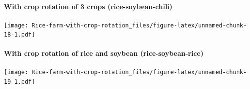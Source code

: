 \documentclass[
]{article}
\newenvironment{Shaded}{\begin{snugshade}}{\end{snugshade}}
\newcommand{\AttributeTok}[1]{\textcolor[rgb]{0.13,0.29,0.53}{#1}}
\newcommand{\DecValTok}[1]{\textcolor[rgb]{0.00,0.00,0.81}{#1}}
\newcommand{\FunctionTok}[1]{\textcolor[rgb]{0.13,0.29,0.53}{\textbf{#1}}}
\newcommand{\NormalTok}[1]{#1}
\newcommand{\OtherTok}[1]{\textcolor[rgb]{0.56,0.35,0.01}{#1}}
\newcommand{\SpecialCharTok}[1]{\textcolor[rgb]{0.81,0.36,0.00}{\textbf{#1}}}
\begin{document}
\hypertarget{with-crop-rotation-of-3-crops-rice-soybean-chili-1}{%
\paragraph{With crop rotation of 3 crops
(rice-soybean-chili)}\label{with-crop-rotation-of-3-crops-rice-soybean-chili-1}}

\begin{Shaded}
\end{Shaded}

\texttt{[image: Rice-farm-with-crop-rotation\_files/figure-latex/unnamed-chunk-18-1.pdf]}

\hypertarget{with-crop-rotation-of-rice-and-soybean-rice-soybean-rice-1}{%
\paragraph{With crop rotation of rice and soybean
(rice-soybean-rice)}\label{with-crop-rotation-of-rice-and-soybean-rice-soybean-rice-1}}

\begin{Shaded}
\end{Shaded}

\texttt{[image: Rice-farm-with-crop-rotation\_files/figure-latex/unnamed-chunk-19-1.pdf]}
\end{document}
